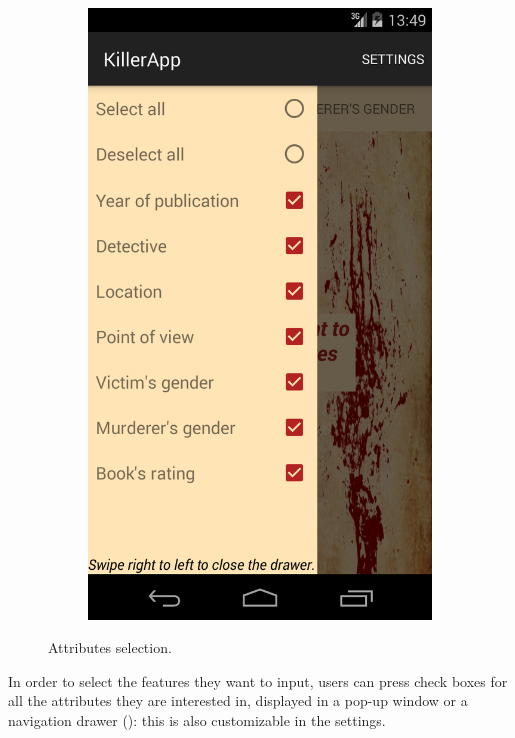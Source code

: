 \documentclass{mproj}
\begin{document}
\begin{figure}[h]
\begin{subfigure}{0.25\textwidth}
	\end{subfigure}		
	\quad
	\begin{subfigure}{0.25\textwidth}
		\includegraphics[width=\textwidth]{images/attributes_drawer}
	\end{subfigure}			
	\caption{Attributes selection.}
	\label{fig:attributes_selection}
\end{figure}

In order to select the features they want to input, users can press check boxes for all the attributes they are interested in, displayed in a pop-up window or a navigation drawer (): this is also customizable in the settings.
\end{document}
